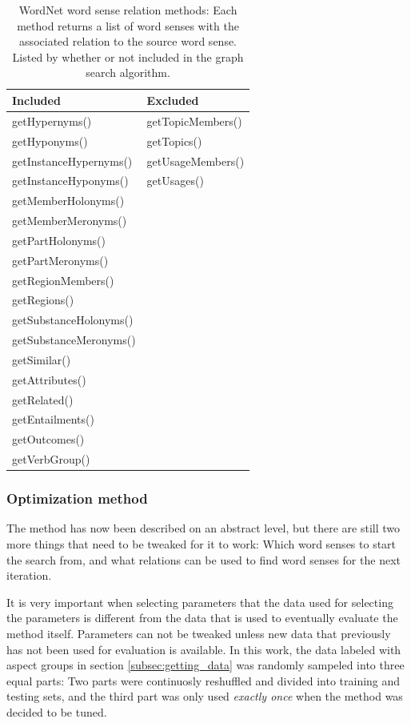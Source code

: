 \documentclass[a4paper,11pt]{kth-mag}
\begin{document}
\begin{table}[b]
  \centering
  \begin{tabular}{| l | l |}
    \hline
    \textbf{Included} & \textbf{Excluded} \\ \hline
    getHypernyms() & getTopicMembers() \\
    getHyponyms() & getTopics() \\
    getInstanceHypernyms() & getUsageMembers() \\
    getInstanceHyponyms() & getUsages() \\
    getMemberHolonyms() & \\
    getMemberMeronyms() & \\
    getPartHolonyms() & \\
    getPartMeronyms() & \\
    getRegionMembers() & \\
    getRegions() & \\
    getSubstanceHolonyms() & \\
    getSubstanceMeronyms() & \\
    getSimilar() & \\
    getAttributes() & \\
    getRelated() & \\
    getEntailments() & \\
    getOutcomes() & \\
    getVerbGroup() & \\
    \hline
  \end{tabular}
  \caption{WordNet\cite{wordnet} word sense relation methods: Each method returns a list of word senses with the
    associated relation to the source word sense. Listed by whether or not included in the graph search algorithm.}
  \label{tab:bfs_relation}
\end{table}


\subsubsection{Optimization method}
The method has now been described on an abstract level, but there are still two more things that need to be tweaked for it to work: Which word senses to start the search from, and what relations can be used to find word senses for the next iteration.

It is very important when selecting parameters that the data used for selecting the parameters is different from the data that is used to eventually evaluate the method itself. Parameters can not be tweaked unless new data that previously has not been used for evaluation is available. In this work, the data labeled with aspect groups in section \ref{subsec:getting_data} was randomly sampeled into three equal parts: Two parts were continuosly reshuffled and divided into training and testing sets, and the third part was only used \emph{exactly once} when the method was decided to be tuned.
\end{document}
